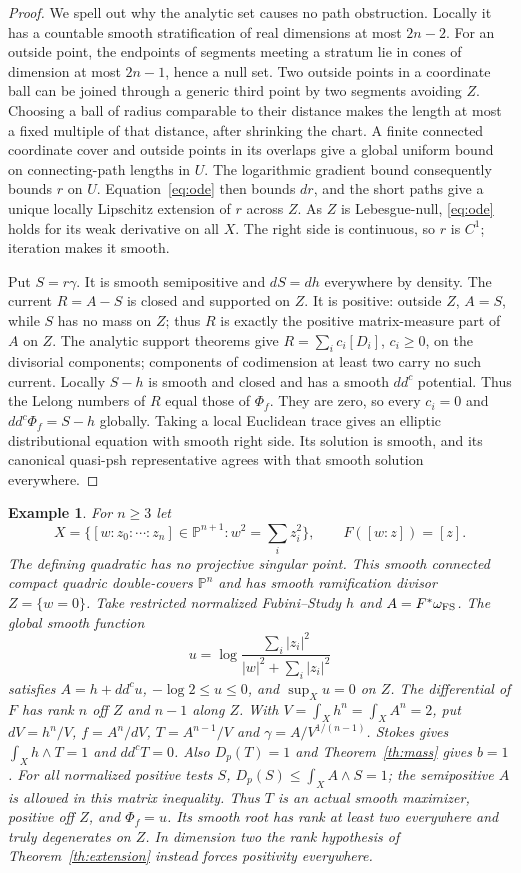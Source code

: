 \documentclass[11pt]{article}
\newcommand{\ddc}{dd^c}
\newcommand{\1}{\mathbf 1}
\newtheorem{example}[theorem]{Example}
\theoremstyle{remark}\newtheorem{remark}[theorem]{Remark}
\begin{document}
\begin{proof}
We spell out why the analytic set causes no path obstruction.
Locally it has a countable smooth stratification of real dimensions at most
$2n-2$. For an outside point, the endpoints of segments meeting a stratum
lie in cones of dimension at most $2n-1$, hence a null set.
Two outside points in a coordinate ball can be joined through a generic
third point by two segments avoiding $Z$. Choosing a ball of radius
comparable to their distance makes the length at most a fixed multiple of
that distance, after shrinking the chart. A finite connected coordinate
cover and outside points in its overlaps give a global uniform bound on
connecting-path lengths in $U$.
The logarithmic gradient bound consequently bounds $r$ on $U$.
Equation~\eqref{eq:ode} then bounds $dr$, and the short paths give a unique
locally Lipschitz extension of $r$ across $Z$.
As $Z$ is Lebesgue-null, \eqref{eq:ode} holds for its weak derivative on all
$X$. The right side is continuous, so $r$ is $C^1$; iteration makes it smooth.

Put $S=r\gamma$. It is smooth semipositive and $dS=dh$ everywhere by density.
The current $R=A-S$ is closed and supported on $Z$.
It is positive: outside $Z$, $A=S$, while $S$ has no mass on $Z$;
thus $R$ is exactly the positive matrix-measure part of $A$ on $Z$.
The analytic support theorems \cite[III.2.10--2.14]{Dem} give
$R=\sum_i c_i[D_i]$, $c_i\geq0$, on the divisorial components;
components of codimension at least two carry no such current.
Locally $S-h$ is smooth and closed and has a smooth $\ddc$ potential.
Thus the Lelong numbers of $R$ equal those of $\Phi_f$.
They are zero, so every $c_i=0$ and $\ddc\Phi_f=S-h$ globally.
Taking a local Euclidean trace gives an elliptic distributional equation
with smooth right side. Its solution is smooth, and its canonical
quasi-psh representative agrees with that smooth solution everywhere.
\end{proof}

\begin{example}\label{ex:quadric}
For $n\geq3$ let
\[
 X=\{[w:z_0:\cdots:z_n]\in\mathbb P^{n+1}:w^2=\textstyle\sum_i z_i^2\},
 \qquad F([w:z])=[z].
\]
The defining quadratic has no projective singular point. This smooth
connected compact quadric double-covers $\mathbb P^n$ and has smooth
ramification divisor $Z=\{w=0\}$.
Take restricted normalized Fubini--Study $h$ and $A=F^*\omega_{\rm FS}$.
The global smooth function
\[
 u=\log\frac{\sum_i|z_i|^2}{|w|^2+\sum_i|z_i|^2}
\]
satisfies $A=h+\ddc u$, $-\log2\leq u\leq0$, and $\sup_Xu=0$ on $Z$.
The differential of $F$ has rank $n$ off $Z$ and $n-1$ along $Z$.
With $V=\int_Xh^n=\int_XA^n=2$, put $dV=h^n/V$, $f=A^n/dV$,
$T=A^{n-1}/V$ and $\gamma=A/V^{1/(n-1)}$.
Stokes gives $\int_Xh\wedge T=1$ and $\ddc T=0$.
Also $D_p(T)=1$ and Theorem~\ref{th:mass} gives $b=1$.
For all normalized positive tests $S$, $D_p(S)\leq\int_XA\wedge S=1$;
the semipositive $A$ is allowed in this matrix inequality.
Thus $T$ is an actual smooth maximizer, positive off $Z$, and $\Phi_f=u$.
Its smooth root has rank at least two everywhere and truly degenerates on
$Z$. In dimension two the rank hypothesis of Theorem~\ref{th:extension}
instead forces positivity everywhere.
\end{example}
\end{document}
